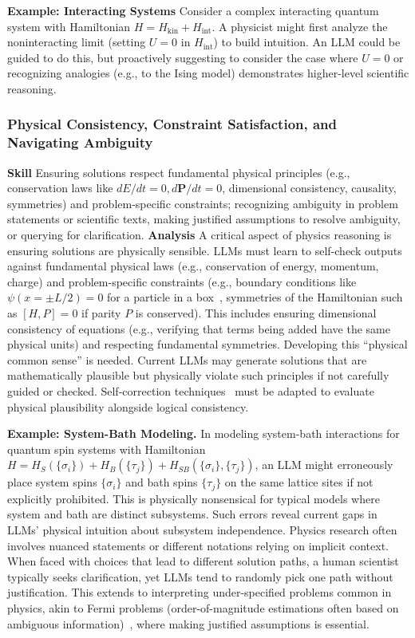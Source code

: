 \textbf{Example: Interacting Systems} Consider a complex interacting quantum system with Hamiltonian $H = H_{\text{kin}} + H_{\text{int}}$. A physicist might first analyze the noninteracting limit (setting $U=0$ in $H_{\text{int}}$) to build intuition. An LLM could be guided to do this, but proactively suggesting to consider the case where $U=0$ or recognizing analogies (e.g., to the Ising model) demonstrates higher-level scientific reasoning.
\subsubsection{Physical Consistency, Constraint Satisfaction, and Navigating Ambiguity}
\label{sec:skill_physical_ambiguity}
\textbf{Skill} Ensuring solutions respect fundamental physical principles (e.g., conservation laws like $dE/dt=0, d\mathbf{P}/dt=0$, dimensional consistency, causality, symmetries) and problem-specific constraints; recognizing ambiguity in problem statements or scientific texts, making justified assumptions to resolve ambiguity, or querying for clarification.
\textbf{Analysis} A critical aspect of physics reasoning is ensuring solutions are physically sensible. LLMs must learn to self-check outputs against fundamental physical laws (e.g., conservation of energy, momentum, charge) and problem-specific constraints (e.g., boundary conditions like $\psi(x=\pm L/2) = 0$ for a particle in a box~\cite{Griffiths2018Introduction}, symmetries of the Hamiltonian such as $[H, P]=0$ if parity $P$ is conserved). This includes ensuring dimensional consistency of equations (e.g., verifying that terms being added have the same physical units) and respecting fundamental symmetries. Developing this ``physical common sense'' is needed. Current LLMs may generate solutions that are mathematically plausible but physically violate such principles if not carefully guided or checked. Self-correction techniques~\cite{Madaan2023SelfRefine, Shinn2023Reflexion, Saunders2022SelfCritiquing} must be adapted to evaluate physical plausibility alongside logical consistency.

\textbf{Example: System-Bath Modeling.} In modeling system-bath interactions for quantum spin systems with Hamiltonian $H = H_S(\{\sigma_i\}) + H_B(\{\tau_j\}) + H_{SB}(\{\sigma_i\}, \{\tau_j\})$, an LLM might erroneously place system spins $\{\sigma_i\}$ and bath spins $\{\tau_j\}$ on the same lattice sites if not explicitly prohibited. This is physically nonsensical for typical models where system and bath are distinct subsystems. Such errors reveal current gaps in LLMs' physical intuition about subsystem independence.
Physics research often involves nuanced statements or different notations relying on implicit context. When faced with choices that lead to different solution paths, a human scientist typically seeks clarification, yet LLMs tend to randomly pick one path without justification. This extends to interpreting under-specified problems common in physics, akin to Fermi problems (order-of-magnitude estimations often based on ambiguous information)~\cite{Weinstein2010Fermi}, where making justified assumptions is essential.

